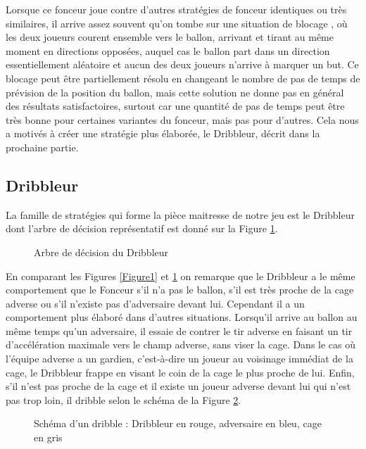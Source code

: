\documentclass[a4paper,12pt]{article}
\numberwithin{equation}{section}
\begin{document}
Lorsque ce fonceur joue contre d'autres stratégies de fonceur identiques ou très similaires, il arrive assez souvent qu'on tombe sur une situation de \og blocage \fg, où les deux joueurs courent ensemble vers le ballon, arrivant et tirant au même moment en directions opposées, auquel cas le ballon part dans un direction essentiellement aléatoire et aucun des deux joueurs n'arrive à marquer un but. Ce blocage peut être partiellement résolu en changeant le nombre de pas de temps de prévision de la position du ballon, mais cette solution ne donne pas en général des résultats satisfactoires, surtout car une quantité de pas de temps peut être très bonne pour certaines variantes du fonceur, mais pas pour d'autres. Cela nous a motivés à créer une stratégie plus élaborée, le Dribbleur, décrit dans la prochaine partie.

\subsection{Dribbleur}

La famille de stratégies qui forme la pièce maitresse de notre jeu est le Dribbleur dont l'arbre de décision représentatif est donné sur la Figure \ref{Figure3}. 

\begin{figure}[ht]
\centering

\caption{Arbre de décision du Dribbleur}
\label{Figure3}
\end{figure}

En comparant les Figures \ref{Figure1} et \ref{Figure3} on remarque que le Dribbleur a le même comportement que le Fonceur s'il n'a pas le ballon, s'il est très proche de la cage adverse ou s'il n'existe pas d'adversaire devant lui. Cependant il a un comportement plus élaboré dans d'autres situations. Lorsqu'il arrive au ballon au même temps qu'un adversaire, il essaie de contrer le tir adverse en faisant un tir d'accélération maximale vers le champ adverse, sans viser la cage. Dans le cas où l’équipe adverse a un gardien, c'est-à-dire un joueur au voisinage immédiat de la cage, le Dribbleur frappe en visant le coin de la cage le plus proche de lui. Enfin, s'il n'est pas proche de la cage et il existe un joueur adverse devant lui qui n'est pas trop loin, il dribble selon le schéma de la Figure \ref{Figure4}.

\begin{figure}[ht]
\centering

\caption{Schéma d'un dribble : Dribbleur en rouge, adversaire en bleu, cage en gris}
\label{Figure4}
\end{figure}
\end{document}

